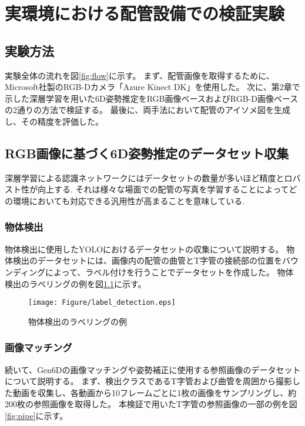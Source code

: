 ﻿\chapter{実環境における配管設備での検証実験}

\section{実験方法}
実験全体の流れを図\ref{fig:flow}に示す。
まず、配管画像を取得するために、Microsoft社製のRGB-Dカメラ「Azure Kinect DK」を使用した。
次に、第2章で示した深層学習を用いた6D姿勢推定をRGB画像ベースおよびRGB-D画像ベースの2通りの方法で検証する。
最後に、両手法において配管のアイソメ図を生成し、その精度を評価した。

\section{RGB画像に基づく6D姿勢推定のデータセット収集}
深層学習による認識ネットワークにはデータセットの数量が多いほど精度とロバスト性が向上する.
それは様々な場面での配管の写真を学習することによってどの環境においても対応できる汎用性が高まることを意味している.

\subsection{物体検出}
物体検出に使用したYOLOにおけるデータセットの収集について説明する。
物体検出のデータセットには、画像内の配管の曲管とT字管の接続部の位置をバウンディングによって、ラベル付けを行うことでデータセットを作成した。
物体検出のラベリングの例を図\ref{fig:f2}に示す。
\begin{figure}[htbt]
	\centering
	 \texttt{[image: Figure/label\_detection.eps]}
	 \caption{物体検出のラベリングの例}
	 \label{fig:f2}
\end{figure}

\subsection{画像マッチング}
続いて、Gen6Dの画像マッチングや姿勢補正に使用する参照画像のデータセットについて説明する。
まず、検出クラスであるT字管および曲管を周囲から撮影した動画を収集し、各動画から10フレームごとに1枚の画像をサンプリングし、約200枚の参照画像を取得した。
本検証で用いたT字管の参照画像の一部の例を図\ref{fig:pipe}に示す。

